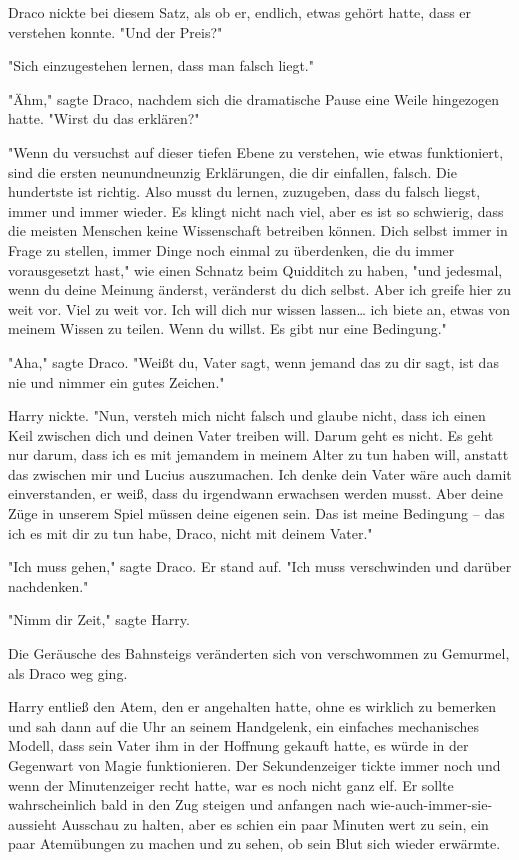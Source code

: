 {Draco nickte bei diesem Satz, als ob er, endlich, etwas gehört hatte, dass er verstehen konnte. "Und der Preis?"

"Sich einzugestehen lernen, dass man falsch liegt."

"Ähm," sagte Draco, nachdem sich die dramatische Pause eine Weile hingezogen hatte. "Wirst du das erklären?"

"Wenn du versuchst auf dieser tiefen Ebene zu verstehen, wie etwas funktioniert, sind die ersten neunundneunzig Erklärungen, die dir einfallen, falsch. Die hundertste ist richtig. Also musst du lernen, zuzugeben, dass du falsch liegst, immer und immer wieder. Es klingt nicht nach viel, aber es ist so schwierig, dass die meisten Menschen keine Wissenschaft betreiben können. Dich selbst immer in Frage zu stellen, immer Dinge noch einmal zu überdenken, die du immer vorausgesetzt hast," wie einen Schnatz beim Quidditch zu haben, "und jedesmal, wenn du deine Meinung änderst, veränderst du dich selbst. Aber ich greife hier zu weit vor. Viel zu weit vor. Ich will dich nur wissen lassen… ich biete an, etwas von meinem Wissen zu teilen. Wenn du willst. Es gibt nur eine Bedingung."

"Aha," sagte Draco. "Weißt du, Vater sagt, wenn jemand das zu dir sagt, ist das nie und nimmer ein gutes Zeichen."

Harry nickte. "Nun, versteh mich nicht falsch und glaube nicht, dass ich einen Keil zwischen dich und deinen Vater treiben will. Darum geht es nicht. Es geht nur darum, dass ich es mit jemandem in meinem Alter zu tun haben will, anstatt das zwischen mir und Lucius auszumachen. Ich denke dein Vater wäre auch damit einverstanden, er weiß, dass du irgendwann erwachsen werden musst. Aber deine Züge in unserem Spiel müssen deine eigenen sein. Das ist meine Bedingung -- das ich es mit dir zu tun habe, Draco, nicht mit deinem Vater."

"Ich muss gehen," sagte Draco. Er stand auf. "Ich muss verschwinden und darüber nachdenken."

"Nimm dir Zeit," sagte Harry.

Die Geräusche des Bahnsteigs veränderten sich von verschwommen zu Gemurmel, als Draco weg ging.

Harry entließ den Atem, den er angehalten hatte, ohne es wirklich zu bemerken und sah dann auf die Uhr an seinem Handgelenk, ein einfaches mechanisches Modell, dass sein Vater ihm in der Hoffnung gekauft hatte, es würde in der Gegenwart von Magie funktionieren. Der Sekundenzeiger tickte immer noch und wenn der Minutenzeiger recht hatte, war es noch nicht ganz elf. Er sollte wahrscheinlich bald in den Zug steigen und anfangen nach wie-auch-immer-sie-aussieht Ausschau zu halten, aber es schien ein paar Minuten wert zu sein, ein paar Atemübungen zu machen und zu sehen, ob sein Blut sich wieder erwärmte.

}

